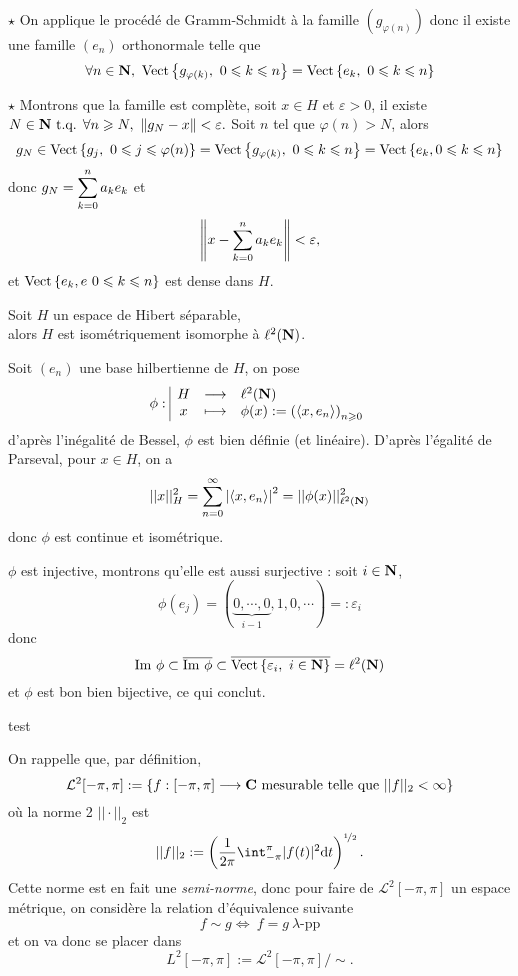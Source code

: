 \documentclass[a4paper,11pt, twoside]{article}
\begin{document}
\begin{Proof}
  $\star$ On applique le procédé de Gramm-Schmidt à la famille $(g_{\varphi(n)})$ donc il existe une famille $(e_n)$ orthonormale telle que 
  $$\forall n\in \N,\ \mathrm{Vect}\ens{g_{\varphi(k)},\ 0\leqslant k\leqslant n}= \mathrm{Vect}\ens{e_k,\ 0\leqslant k\leqslant n}$$

  $\star$ Montrons que la famille est complète, soit $x\in H$ et $\varepsilon>0$, il existe $N\in\N\tq \forall n\geqslant N,\ \norm{g_N-x}<\varepsilon.$ Soit $n$ tel que $\varphi(n)>N$, alors 
  $$g_N\in \mathrm{Vect}\ens{g_j,\ 0\leqslant j\leqslant \varphi(n)}=\mathrm{Vect}\ens{g_{\varphi(k)},\ 0\leqslant k\leqslant n}=\mathrm{Vect}\ens{e_k, 0\leqslant k\leqslant n}$$
  donc $g_N=\displaystyle\sum_{k=0}^na_ke_k$ et 
  $$\left\lVert x-\sum_{k=0}^na_ke_k\right\rVert<\varepsilon,$$
  et $\mathrm{Vect}\left\{e_k,e\ 0\leqslant k\leqslant n\right\}$ est dense dans $H$.
\end{Proof}


\begin{Th}
  Soit $H$ un espace de Hibert séparable,\\

  alors $H$ est isométriquement isomorphe à $\ell^2(\mathbf N)$.
\end{Th}


\begin{Proof}
  Soit $(e_n)$ une base hilbertienne de $H$, on pose
  $$\phi:\begin{array}{|ccl}
    H&\longrightarrow&\ell^2(\mathbf N)\\
    x&\longmapsto&\phi(x):=\left(\left\langle x,e_n \right\rangle\right)_{n\geqslant 0}
  \end{array}$$
  d'après l'inégalité de Bessel, $\phi$ est bien définie (et linéaire).
  D'après l'égalité de Parseval, pour $x\in H$, on a
  $$||x||_{H}^2=\sum_{n=0}^\infty\left| \left\langle x,e_n \right\rangle\right|^2=||\phi(x)||_{\ell^2(\mathbf N)}^2$$
  donc $\phi$ est continue et isométrique.

  $\phi$ est injective, montrons qu'elle est aussi surjective : soit $i\in \mathbf N$, 
  $$\phi(e_j)=(\underbrace{0,\cdots,0}_{i-1},1,0,\cdots)=:\varepsilon_i$$
  donc 
  $$\mathrm{Im}\ \phi\subset\overline{\mathrm{Im}\ \phi}\subset\overline{\mathrm{Vect}\ens{\varepsilon_i,\ i\in\N}}=\ell^2(\N)$$
  et $\phi$ est bon bien bijective, ce qui conclut.
\end{Proof}{\color{white}test}\\[2em]



On rappelle que, par définition, 
$$\mathcal L^2[-\pi,\pi]:=\left\{f:[-\pi,\pi]\longrightarrow\mathbf C\text{ mesurable telle que }||f||_2<\infty\right\}$$
où la norme 2 $||\cdot||_2$ est 
$$||f||_2:=\left(\frac{1}{2\pi}\int_{-\pi}^{\pi}|f(t)|^2\dt\right)^{\nicefrac12}.$$
Cette norme est en fait une \emph{semi-norme}, donc pour faire de $\mathcal L^2[-\pi,\pi]$ un espace métrique, on considère la relation d'équivalence suivante 
$$f\sim g\Leftrightarrow\ f=g\ \lambda\text{-pp}$$
et on va donc se placer dans 
$$L^2[-\pi,\pi]:=\mathcal L^2[-\pi,\pi]/\sim.$$
\end{document}
